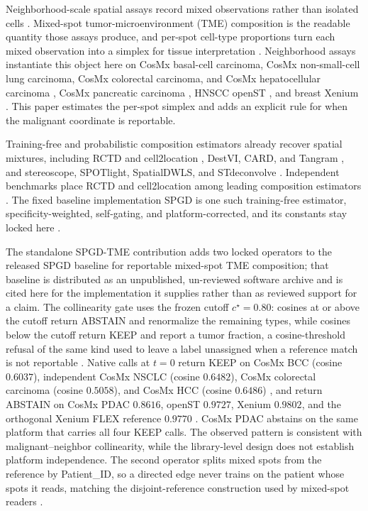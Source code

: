 Neighborhood-scale spatial assays record mixed observations rather than isolated cells \citep{Stahl2016,Moses2022,Rao2021}. Mixed-spot tumor-microenvironment (TME) composition is the readable quantity those assays produce, and per-spot cell-type proportions turn each mixed observation into a simplex for tissue interpretation \citep{Cable2022,Kleshchevnikov2022,Danaher2022,Miller2022,Newman2019,Elhanani2023}. Neighborhood assays instantiate this object here on CosMx basal-cell carcinoma, CosMx non-small-cell lung carcinoma, CosMx colorectal carcinoma, and CosMx hepatocellular carcinoma \citep{He2022,Andreatta2024zenodo,Crowell2025preprint,Sun2025spatial}, CosMx pancreatic carcinoma \citep{Pei2025}, HNSCC openST \citep{Schott2024}, and breast Xenium \citep{Janesick2023}. This paper estimates the per-spot simplex and adds an explicit rule for when the malignant coordinate is reportable.

Training-free and probabilistic composition estimators already recover spatial mixtures, including RCTD and cell2location \citep{Cable2022,Kleshchevnikov2022}, DestVI, CARD, and Tangram \citep{Lopez2022,Ma2022,Biancalani2021}, and stereoscope, SPOTlight, SpatialDWLS, and STdeconvolve \citep{Andersson2020,ElosuaBayes2021,Dong2021,Miller2022}. Independent benchmarks place RCTD and cell2location among leading composition estimators \citep{Li2022integrate,Sangaram2024}. The fixed baseline implementation SPGD is one such training-free estimator, specificity-weighted, self-gating, and platform-corrected, and its constants stay locked here \citep{Fu2026spgd}.

The standalone SPGD-TME contribution adds two locked operators to the released SPGD baseline for reportable mixed-spot TME composition; that baseline is distributed as an unpublished, un-reviewed software archive \citep{Fu2026spgd} and is cited here for the implementation it supplies rather than as reviewed support for a claim. The collinearity gate uses the frozen cutoff \(c^\star=0.80\): cosines at or above the cutoff return ABSTAIN and renormalize the remaining types, while cosines below the cutoff return KEEP and report a tumor fraction, a cosine-threshold refusal of the same kind used to leave a label unassigned when a reference match is not reportable \citep{Kiselev2018,deKanter2019}. Native calls at \(t=0\) return KEEP on CosMx BCC (cosine \(0.6037\)), independent CosMx NSCLC (cosine \(0.6482\)), CosMx colorectal carcinoma (cosine \(0.5058\)), and CosMx HCC (cosine \(0.6486\)) \citep{He2022,Andreatta2024zenodo,Crowell2025preprint,Sun2025spatial}, and return ABSTAIN on CosMx PDAC \(0.8616\), openST \(0.9727\), Xenium \(0.9802\), and the orthogonal Xenium FLEX reference \(0.9770\) \citep{Pei2025,Schott2024,Janesick2023}. CosMx PDAC abstains on the same platform that carries all four KEEP calls. The observed pattern is consistent with malignant--neighbor collinearity, while the library-level design does not establish platform independence. The second operator splits mixed spots from the reference by Patient\_ID, so a directed edge never trains on the patient whose spots it reads, matching the disjoint-reference construction used by mixed-spot readers \citep{Cable2022,Kleshchevnikov2022}.

